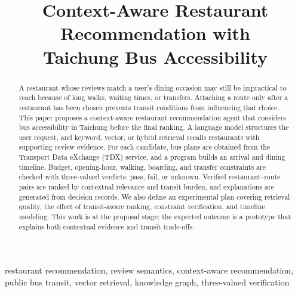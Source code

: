 \documentclass[conference]{IEEEtran}
\begin{document}
\title{Context-Aware Restaurant Recommendation with\\Taichung Bus Accessibility}

\author{
}
\maketitle

\begin{abstract}
A restaurant whose reviews match a user's dining occasion may still be impractical to reach because of long walks, waiting times, or transfers. Attaching a route only after a restaurant has been chosen prevents transit conditions from influencing that choice. This paper proposes a context-aware restaurant recommendation agent that considers bus accessibility in Taichung before the final ranking. A language model structures the user request, and keyword, vector, or hybrid retrieval recalls restaurants with supporting review evidence. For each candidate, bus plans are obtained from the Transport Data eXchange (TDX) service, and a program builds an arrival and dining timeline. Budget, opening-hour, walking, boarding, and transfer constraints are checked with three-valued verdicts: pass, fail, or unknown. Verified restaurant--route pairs are ranked by contextual relevance and transit burden, and explanations are generated from decision records. We also define an experimental plan covering retrieval quality, the effect of transit-aware ranking, constraint verification, and timeline modeling. This work is at the proposal stage; the expected outcome is a prototype that explains both contextual evidence and transit trade-offs.
\end{abstract}
\begin{IEEEkeywords}
restaurant recommendation, review semantics, context-aware recommendation, public bus transit, vector retrieval, knowledge graph, three-valued verification
\end{IEEEkeywords}

\end{document}
